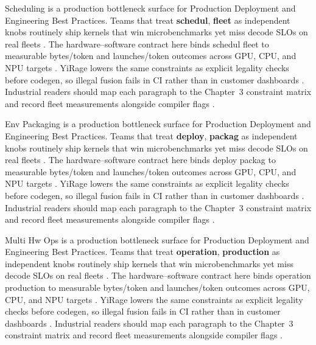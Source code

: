 Scheduling is a production bottleneck surface for Production Deployment and Engineering Best Practices. Teams that treat \textbf{schedul}, \textbf{fleet} as independent knobs routinely ship kernels that win microbenchmarks yet miss decode SLOs on real fleets \citep{liu2024deepseekv3,memoryfloor2026}. The hardware--software contract here binds schedul fleet to measurable bytes/token and launches/token outcomes across GPU, CPU, and NPU targets \citep{patel2025llminference,nvidia2022hopper}. YiRage lowers the same constraints as explicit legality checks before codegen, so illegal fusion fails in CI rather than in customer dashboards \citep{taxbreak2026,semianalysis2024tma}. Industrial readers should map each paragraph to the Chapter~3 constraint matrix and record fleet measurements alongside compiler flags \citep{memoryfloor2026,amd2024xdna}.

Env Packaging is a production bottleneck surface for Production Deployment and Engineering Best Practices. Teams that treat \textbf{deploy}, \textbf{packag} as independent knobs routinely ship kernels that win microbenchmarks yet miss decode SLOs on real fleets \citep{patel2025llminference,nvidia2022hopper}. The hardware--software contract here binds deploy packag to measurable bytes/token and launches/token outcomes across GPU, CPU, and NPU targets \citep{taxbreak2026,semianalysis2024tma}. YiRage lowers the same constraints as explicit legality checks before codegen, so illegal fusion fails in CI rather than in customer dashboards \citep{memoryfloor2026,amd2024xdna}. Industrial readers should map each paragraph to the Chapter~3 constraint matrix and record fleet measurements alongside compiler flags \citep{nvidia2022hopper,amd2024aie}.

Multi Hw Ops is a production bottleneck surface for Production Deployment and Engineering Best Practices. Teams that treat \textbf{operation}, \textbf{production} as independent knobs routinely ship kernels that win microbenchmarks yet miss decode SLOs on real fleets \citep{taxbreak2026,semianalysis2024tma}. The hardware--software contract here binds operation production to measurable bytes/token and launches/token outcomes across GPU, CPU, and NPU targets \citep{memoryfloor2026,amd2024xdna}. YiRage lowers the same constraints as explicit legality checks before codegen, so illegal fusion fails in CI rather than in customer dashboards \citep{nvidia2022hopper,amd2024aie}. Industrial readers should map each paragraph to the Chapter~3 constraint matrix and record fleet measurements alongside compiler flags \citep{semianalysis2024tma,dlbook}.

